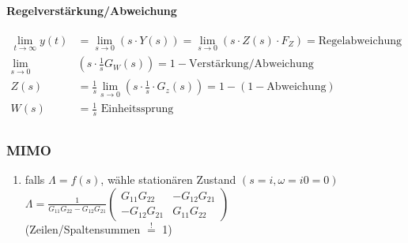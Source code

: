 \documentclass{article}
\begin{document}
\begin{landscape}
\begin{multicols}{2}
\begin{multicols}{2}
\begin{multicols}{2}
\end{multicols}

%
%
%
%	


\paragraph{Regelverstärkung/Abweichung}
	\begin{align*}
		\lim _{t \rightarrow \infty} y(t) & =\lim _{s \rightarrow 0}(s \cdot Y(s))=\lim _{s \rightarrow 0}\left(s \cdot Z(s) \cdot F_{Z}\right) = \text{Regelabweichung}\\
		\lim_{s\rightarrow0} & \left(s\cdot\frac{1}{s} G_W(s)\right) = 1 - \text{Verstärkung/Abweichung} \\
		Z(s) &=\frac{1}{s} \lim _{s \rightarrow 0} \left(s \cdot \frac{1}{s} \cdot G_{z}(s)\right) = 1 -( 1- \text{Abweichung} ) \\
		W(s) &= \frac{1}{s} \text{ Einheitssprung} \\
	\end{align*}


\subsubsection*{MIMO}
\begin{enumerate}
\item  falls $\Lambda=f(s)$, wähle stationären Zustand $(s=i, \omega=i 0=0)$ \\
$\Lambda=\frac{1}{G_{11} G_{22}-G_{12} G_{21}}\left(\begin{array}{cc}G_{11} G_{22} & -G_{12} G_{21} \\ -G_{12} G_{21} & G_{11} G_{22}\end{array}\right)$ \\
(Zeilen/Spaltensummen $\overset{!}{=}$ 1)


\end{enumerate}
\end{multicols}
\end{multicols}
\end{landscape}
\end{document}
